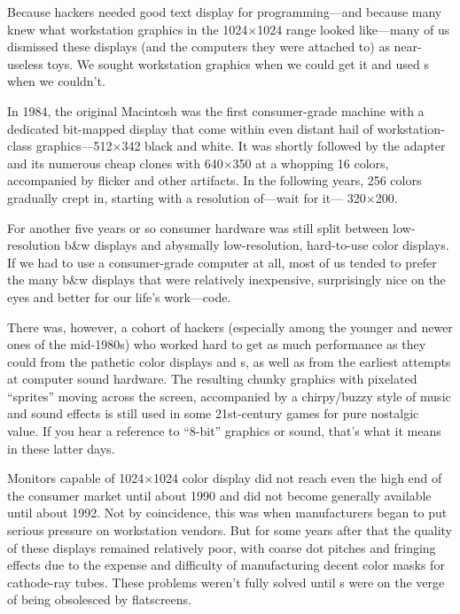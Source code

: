 Because hackers needed good text display for programming---and because many
knew what workstation graphics in the 1024$\times$1024 range looked like---many of us
dismissed these displays (and the computers they were attached to) as
near-useless toys. We sought workstation graphics when we could get it and used
s when we couldn't.

In 1984, the original Macintosh was the first consumer-grade machine with a
dedicated bit-mapped display that come within even distant hail of
workstation-class graphics---512$\times$342 black and white. It was shortly followed
by the  adapter and its numerous cheap clones with 640$\times$350 at a whopping
16 colors, accompanied by flicker and other artifacts. In the following years,
256 colors gradually crept in, starting with a resolution of---wait for it---
320$\times$200.

For another five years or so consumer hardware was still split between
low-resolution b\&w displays and abysmally low-resolution, hard-to-use color
displays. If we had to use a consumer-grade computer at all, most of us tended
to prefer the many b\&w displays that were relatively inexpensive, surprisingly
nice on the eyes and better for our life's work---code.

There was, however, a cohort of hackers (especially among the younger and newer
ones of the mid-1980s) who worked hard to get as much performance as they could
from the pathetic color displays and s, as well as from the earliest attempts
at computer sound hardware. The resulting chunky graphics with pixelated
``sprites'' moving across the screen, accompanied by a chirpy/buzzy style of
music and sound effects is still used in some 21st-century games for pure
nostalgic value. If you hear a reference to ``8-bit'' graphics or sound, that's
what it means in these latter days.

Monitors capable of 1024$\times$1024 color display did not reach even the high end of
the consumer market until about 1990 and did not become generally available
until about 1992. Not by coincidence, this was when  manufacturers began to
put serious pressure on workstation vendors. But for some years after that the
quality of these displays remained relatively poor, with coarse dot pitches and
fringing effects due to the expense and difficulty of manufacturing decent
color masks for cathode-ray tubes. These problems weren't fully solved until
s were on the verge of being obsolesced by flatscreens.

